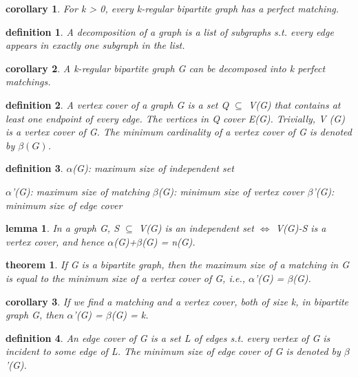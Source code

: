 \documentclass[twocolumn]{article}
\newtheorem{theorem}{theorem}[section]  %
\newtheorem{definition}{definition}
\newtheorem{lemma}{lemma}
\newtheorem{corollary}{corollary}
\begin{document}
\begin{CJK*}{UTF8}{bkai}
    \begin{corollary}
         For k > 0, every k-regular bipartite graph has a perfect matching.
    \end{corollary}

    \begin{definition}
         A decomposition of a graph is a list of subgraphs s.t. every edge appears in
 exactly one subgraph in the list.
    \end{definition}

    \begin{corollary}
        A k-regular bipartite graph G can be decomposed into k perfect matchings.
    \end{corollary}

    \begin{definition}
        A vertex cover of a graph G is a set Q $\subseteq$ V(G) that contains at least one
 endpoint of every edge. The vertices in Q cover E(G).
 Trivially, V (G) is a vertex cover of G. The minimum cardinality of a vertex
 cover of G is denoted by $\beta(G)$.
    \end{definition}

    \begin{definition}
        $\alpha$(G): maximum size of independent set

 $\alpha$'(G): maximum size of matching
 $\beta$(G): minimum size of vertex cover
 $\beta$'(G): minimum size of edge cover
    \end{definition}

    \begin{lemma}
        In a graph G, S $\subseteq$ V(G) is an independent set $\iff$ V(G)-S is a vertex cover,
 and hence $\alpha$(G)+$\beta$(G) = n(G).
    \end{lemma}

    \begin{theorem}
        If G is a bipartite graph, then the maximum size of a matching in G is equal
 to the minimum size of a vertex cover of G, i.e., $\alpha$'(G) = $\beta$(G).
    \end{theorem}

    \begin{corollary}
         If we find a matching and a vertex cover, both of size k, in bipartite graph G,
 then $\alpha$'(G) = $\beta$(G) = k.
    \end{corollary}

    \begin{definition}
        An edge cover of G is a set L of edges s.t. every vertex of G is incident to
 some edge of L.
 The minimum size of edge cover of G is denoted by $\beta$'(G).
    \end{definition}


\end{CJK*}
\end{document}
